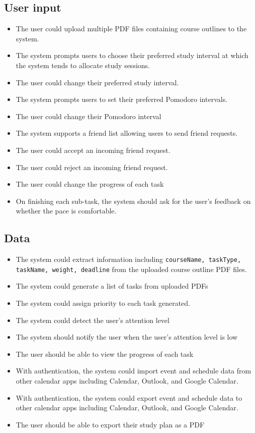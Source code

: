 \documentclass[12pt]{article}
\newcounter{reqnum} %
\newcommand{\rthereqnum}{FR\refstepcounter{reqnum}\thereqnum:}
\begin{document}
\subsection{User input}
\begin{itemize}
\item[\rthereqnum \label{R_upload_pdf}]
The user could upload multiple PDF files containing course outlines to the system.
\item[\rthereqnum]
The system prompts users to choose their preferred study interval at which the system tends to allocate study sessions.
\item[\rthereqnum]
The user could change their preferred study interval.
\item[\rthereqnum]
The system prompts users to set their preferred Pomodoro intervals. 
\item[\rthereqnum]
The user could change their Pomodoro interval
\item[\rthereqnum]
The system supports a friend list allowing users to send friend requests.
\item[\rthereqnum]
The user could accept an incoming friend request.
\item[\rthereqnum]
The user could reject an incoming friend request.
\item[\rthereqnum]
The user could change the progress of each task
\item[\rthereqnum]
On finishing each sub-task, the system should ask for the user's feedback on whether the pace is comfortable.
\end{itemize}

\subsection{Data}
\begin{itemize}
\item[\rthereqnum]
The system could extract information including \texttt{courseName, taskType, taskName, weight, deadline} from the uploaded course outline PDF files.
\item[\rthereqnum]
The system could generate a list of tasks from uploaded PDFs 
\item[\rthereqnum \label{R_prioritize_task}]
The system could assign priority to each task generated.
\item[\rthereqnum]
The system could detect the user's attention level
\item[\rthereqnum]
The system should notify the user when the user's attention level is low
\item[\rthereqnum \label{R_check_task_progress}]
The user should be able to view the progress of each task
\item[\rthereqnum]
With authentication, the system could import event and schedule data from other calendar apps including Calendar, Outlook, and Google Calendar.
\item[\rthereqnum]
With authentication, the system could export event and schedule data to other calendar apps including Calendar, Outlook, and Google Calendar.
\item[\rthereqnum]
The user should be able to export their study plan as a PDF
\end{itemize}
\end{document}
